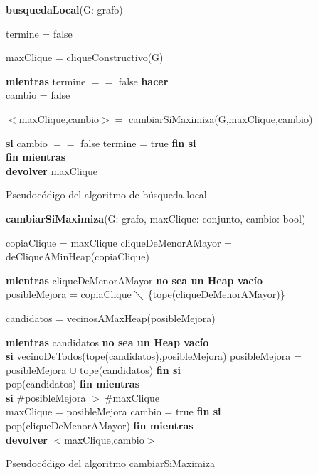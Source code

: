 \vspace{2em}
\incmargin{1em}
\linesnumbered
{}
\footnotesize 
\textbf{busquedaLocal}(G: grafo) \\
\begin{algorithm}[H]
	\BlankLine
	termine = false

	maxClique = cliqueConstructivo(G)
	
	\textbf{mientras} termine $==$ false \textbf{hacer}\\
		
		\tab cambio = false

		\tab $<$maxClique,cambio$> =$ cambiarSiMaximiza(G,maxClique,cambio)
		
		\tab \textbf{si} cambio $==$ false
			\tab \tab termine = true
		\tab \textbf{fin si}\\
	\textbf{fin mientras}\\

	\textbf{devolver} maxClique

\caption{Pseudocódigo del algoritmo de búsqueda local}
\end{algorithm}

\vspace{3em}


\textbf{cambiarSiMaximiza}(G: grafo, maxClique: conjunto, cambio: bool) \\
\begin{algorithm}[H]
	\BlankLine
	copiaClique = maxClique
	cliqueDeMenorAMayor = deCliqueAMinHeap(copiaClique)

	\textbf{mientras} cliqueDeMenorAMayor \textbf{no sea un Heap vacío}\\

		\tab posibleMejora = copiaClique $\diagdown$ \{tope(cliqueDeMenorAMayor)\}

		\tab candidatos = vecinosAMaxHeap(posibleMejora)
		
		\tab \textbf{mientras} candidatos \textbf{no sea un Heap vacío}\\
			\tab \tab \textbf{si} vecinoDeTodos(tope(candidatos),posibleMejora)
				\tab \tab \tab posibleMejora = posibleMejora $\cup$ tope(candidatos)
			\tab \tab \textbf{fin si}\\
			\tab \tab pop(candidatos)
		\tab \textbf{fin mientras}\\


		\tab \textbf{si} $\#$posibleMejora $>\ \#$maxClique\\
			\tab \tab maxClique = posibleMejora
			\tab \tab cambio = true
		\tab \textbf{fin si}\\
		\tab pop(cliqueDeMenorAMayor)
	\textbf{fin mientras}\\

	\textbf{devolver} $<$maxClique,cambio$>$

\caption{Pseudocódigo del algoritmo cambiarSiMaximiza}
\end{algorithm}

